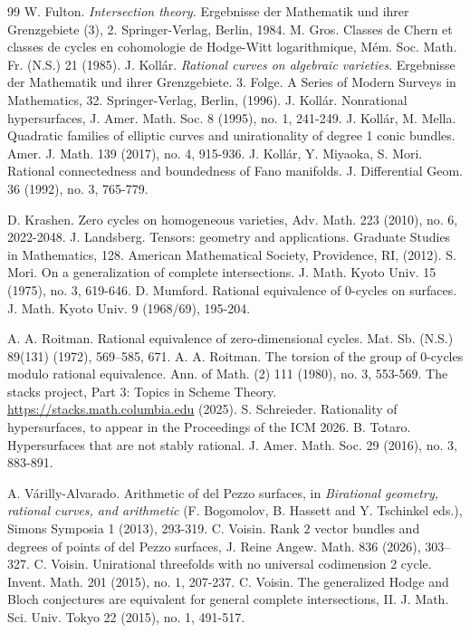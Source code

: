 \documentclass[10pt]{article}
\begin{document}
\begin{thebibliography}{99}
     W. Fulton. {\it Intersection theory.} Ergebnisse der Mathematik und ihrer Grenzgebiete (3), 2. Springer-Verlag, Berlin, 1984.
         M. Gros.  Classes de Chern et classes de cycles en cohomologie de Hodge-Witt logarithmique, M\'{e}m. Soc. Math. Fr.  (N.S.) 21 (1985).
  J. Koll\'ar. {\it Rational curves on algebraic varieties}. Ergebnisse der Mathematik und ihrer Grenzgebiete. 3. Folge. A Series of Modern Surveys in Mathematics, 32. Springer-Verlag, Berlin, (1996).
 J. Koll\'ar. Nonrational hypersurfaces, J. Amer. Math. Soc. 8 (1995), no. 1, 241-249.
 J. Koll\'ar, M. Mella. Quadratic families of elliptic curves and unirationality of
degree 1 conic bundles. Amer. J. Math. 139 (2017), no. 4, 915-936.
 J. Koll\'{a}r, Y. Miyaoka, S. Mori. Rational connectedness and boundedness of Fano manifolds. J. Differential Geom. 36 (1992), no. 3, 765-779.


 D. Krashen. Zero cycles on homogeneous varieties, Adv. Math. 223 (2010), no. 6, 2022-2048.
 J. Landsberg. Tensors: geometry and applications.
Graduate Studies in Mathematics, 128. American Mathematical Society, Providence, RI, (2012).
 S. Mori. On a generalization of complete intersections. J. Math. Kyoto Univ. 15 (1975), no. 3, 619-646.
 D. Mumford.  Rational equivalence of 0-cycles on surfaces. J. Math. Kyoto Univ. 9 (1968/69), 195-204.

  A. A. Roitman. Rational equivalence of zero-dimensional cycles.  Mat. Sb. (N.S.) 89(131) (1972), 569–585, 671.
     A. A. Roitman.  The torsion of the group of 0-cycles modulo rational equivalence. Ann. of Math. (2) 111 (1980), no. 3, 553-569.
 The stacks project, Part 3: Topics in Scheme Theory. {\url{https://stacks.math.columbia.edu}} (2025).
 S. Schreieder. Rationality of hypersurfaces, to appear in the Proceedings of the ICM 2026.
 B. Totaro. Hypersurfaces that are not stably rational. J. Amer. Math. Soc. 29 (2016), no. 3, 883-891.

     A.  V\'{a}rilly-Alvarado. Arithmetic of del Pezzo surfaces, in {\it  Birational geometry, rational curves, and
arithmetic} (F. Bogomolov, B. Hassett and Y. Tschinkel eds.), Simons Symposia 1 (2013), 293-319.
 C. Voisin.  Rank $2$ vector bundles and   degrees of points of del Pezzo surfaces,  J. Reine Angew. Math. 836 (2026), 303–327.
     C. Voisin. Unirational threefolds with no universal codimension 2 cycle. Invent. Math. 201 (2015), no. 1, 207-237.
         C. Voisin. The generalized Hodge and Bloch conjectures are equivalent for general complete intersections, II. J. Math. Sci. Univ. Tokyo 22 (2015), no. 1, 491-517.
\end{thebibliography}
\end{document}
